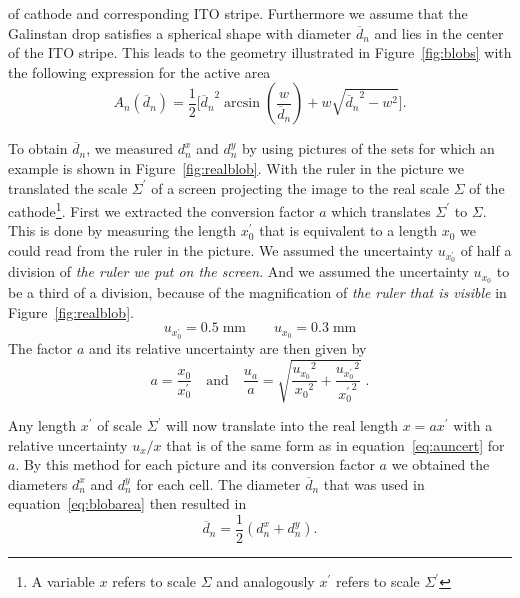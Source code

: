 \begin{multicols}{2}

of cathode and corresponding ITO stripe. Furthermore we assume that the Galinstan drop satisfies a spherical shape with diameter $\overline{d}_n$ and lies in the center of the ITO stripe. This leads to the geometry illustrated in Figure~\ref{fig:blobs} with the following expression for the active area
\begin{equation}\label{eq:blobarea}
A_n({\overline{d}_n}) = \frac{1}{2} \Bigg[ {\overline{d}_n}^2 \arcsin\left(\frac{w}{{\overline{d}_n}}\right) + w \sqrt{{\overline{d}_n}^2 - w^2} \Bigg].
\end{equation}

To obtain $\overline{d}_n$, we measured $d_n^x$ and $d_n^y$ by using pictures of the sets for which an example is shown in Figure~\ref{fig:realblob}. With the ruler in the picture we translated the scale $\Sigma^\prime$ of a screen projecting the image to the real scale $\Sigma$ of the cathode\footnote{A variable $x$ refers to scale $\Sigma$ and analogously $x^\prime$ refers to scale $\Sigma^\prime$}.\mypar
First we extracted the conversion factor $a$ which translates $\Sigma^\prime$ to $\Sigma$. This is done by measuring the length $x_0^\prime$ that is equivalent to a length $x_0$ we could read from the ruler in the picture. We assumed the uncertainty $u_{x_0^\prime}$ of half a division of \emph{the ruler we put on the screen}. And we assumed the uncertainty $u_{x_0}$ to be a third of a division, because of the magnification of \emph{the ruler that is visible} in Figure~\ref{fig:realblob}.
\begin{equation*}
u_{x_0^\prime} = 0.5 \;\mathrm{mm} \qquad u_{x_0} = 0.3 \;\mathrm{mm}
\end{equation*}
The factor $a$ and its relative uncertainty are then given by
\begin{equation}\label{eq:auncert}
a=\frac{x_0}{x_0^\prime} \quad \text{and} \quad \frac{u_a}{a} = \sqrt{\frac{{u_{x_0}}^2}{{x_0}^2}+\frac{{u_{x_0^\prime}}^2}{{x_0^\prime}^2}}\;.
\end{equation}

Any length $x^\prime$ of scale $\Sigma^\prime$ will now translate into the real length $x = a x^\prime$ with a relative uncertainty $u_x/x$ that is of the same form as in equation~\ref{eq:auncert} for $a$.\mypar
By this method for each picture and its conversion factor $a$ we obtained the diameters $d^x_n$ and $d^y_n$ for each cell. The diameter $\overline{d}_n$ that was used in equation~\ref{eq:blobarea} then resulted in
\begin{equation}
\overline{d}_n = \frac{1}{2} (d_n^x + d_n^y ).
\end{equation}

\end{multicols}

